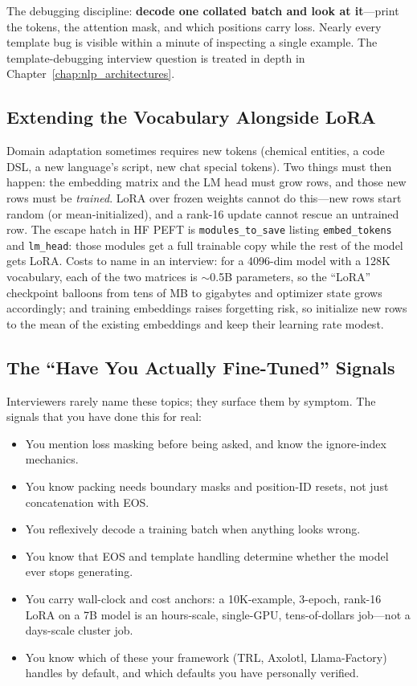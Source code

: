The debugging discipline: \textbf{decode one collated batch and look at it}---print the tokens, the attention mask, and which positions carry loss. Nearly every template bug is visible within a minute of inspecting a single example. The template-debugging interview question is treated in depth in Chapter~\ref{chap:nlp_architectures}.

\subsection{Extending the Vocabulary Alongside LoRA}

Domain adaptation sometimes requires new tokens (chemical entities, a code DSL, a new language's script, new chat special tokens). Two things must then happen: the embedding matrix and the LM head must grow rows, and those new rows must be \emph{trained}. LoRA over frozen weights cannot do this---new rows start random (or mean-initialized), and a rank-16 update cannot rescue an untrained row. The escape hatch in HF PEFT is \texttt{modules\_to\_save} listing \texttt{embed\_tokens} and \texttt{lm\_head}: those modules get a full trainable copy while the rest of the model gets LoRA. Costs to name in an interview: for a 4096-dim model with a 128K vocabulary, each of the two matrices is $\sim$0.5B parameters, so the ``LoRA'' checkpoint balloons from tens of MB to gigabytes and optimizer state grows accordingly; and training embeddings raises forgetting risk, so initialize new rows to the mean of the existing embeddings and keep their learning rate modest.

\subsection{The ``Have You Actually Fine-Tuned'' Signals}

Interviewers rarely name these topics; they surface them by symptom. The signals that you have done this for real:

\begin{itemize}
    \item You mention loss masking before being asked, and know the ignore-index mechanics.
    \item You know packing needs boundary masks and position-ID resets, not just concatenation with EOS.
    \item You reflexively decode a training batch when anything looks wrong.
    \item You know that EOS and template handling determine whether the model ever stops generating.
    \item You carry wall-clock and cost anchors: a 10K-example, 3-epoch, rank-16 LoRA on a 7B model is an hours-scale, single-GPU, tens-of-dollars job---not a days-scale cluster job.
    \item You know which of these your framework (TRL, Axolotl, Llama-Factory) handles by default, and which defaults you have personally verified.
\end{itemize}

